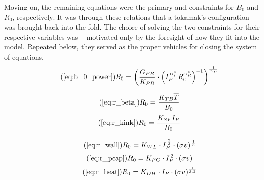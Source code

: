 Moving on, the remaining equations were the primary and  constraints for $B_0$ and $R_0$, respectively. It was through these relations that a tokamak's configuration was brought back into the fold. The choice of solving the two constraints for their respective variables was  -- motivated only by the foresight of how they fit into the model. Repeated below, they served as the proper vehicles for closing the system of equations. 
\begin{equation}
	\tag{\ref{eq:b_0_power}}
	B_0 = \left( \frac{ G_{PB} }{ K_{PB} } \cdot \left( I_P^{\,\alpha_I^*} \, R_0^{ \alpha_R^* } \right)^{-1} \right) ^ { \frac{1}{ \alpha_B } }
\end{equation}

\begin{equation}
  \tag{\ref{eq:r_beta}}
  R_0 = \frac{ K_{TB} \overline{T} }{ B_0 }
\end{equation}
\begin{equation}
	\tag{\ref{eq:r_kink}}
   R_0 = \frac{ K_{SF} I_P }{ B_0 }
\end{equation}

\begin{equation}
	\tag{\ref{eq:r_wall}}
	R_0 = K_{WL} \cdot I_P^{ \, \frac{2}{3} } \cdot (\sigma v) ^{ \, \frac{1}{3} }
\end{equation}
\begin{equation}
	\tag{\ref{eq:r_pcap}}
	R_0 = K_{PC} \cdot I_P^{\,2} \cdot (\sigma v)
\end{equation}
\begin{equation}
	\tag{\ref{eq:r_heat}}
	R_0 = K_{DH} \cdot I_P \cdot (\sigma v)^ {\frac{1}{3.2}} 
\end{equation}

%
